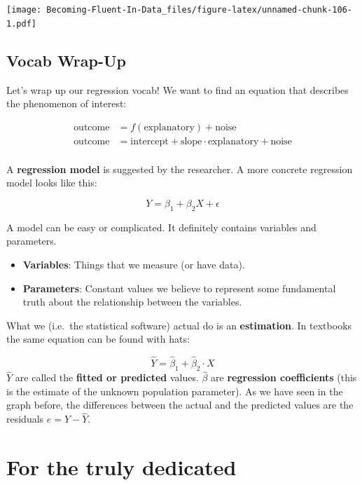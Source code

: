 \documentclass[
]{book}
\providecommand{\tightlist}{%
  \setlength{\itemsep}{0pt}\setlength{\parskip}{0pt}}
\begin{document}
\texttt{[image: Becoming-Fluent-In-Data\_files/figure-latex/unnamed-chunk-106-1.pdf]}

\hypertarget{vocab-wrap-up}{%
\subsection{Vocab Wrap-Up}\label{vocab-wrap-up}}

Let's wrap up our regression vocab! We want to find an equation that describes the phenomenon of interest:

\[ \begin{align}
\text{outcome} &= f(\text{explanatory}) + \text{noise} \tag{Generic statistical model} \\
\text{outcome} &= \text{intercept} + \text{slope} \cdot \text{explanatory} + \text{noise} \tag{Generic linear model} \\
\end{align}\]

A \textbf{regression model} is suggested by the researcher. A more concrete regression model looks like this:

\[Y = \beta_1 + \beta_2 X + \epsilon\]

A model can be easy or complicated. It definitely contains variables and parameters.

\begin{itemize}
\tightlist
\item
  \textbf{Variables}: Things that we measure (or have data).
\item
  \textbf{Parameters}: Constant values we believe to represent some fundamental truth about the relationship between the variables.
\end{itemize}

What we (i.e.~the statistical software) actual do is an \textbf{estimation}. In textbooks the same equation can be found with hats:

\[   \widehat{Y}  = \widehat{\beta}_1 + \widehat{\beta}_2 \cdot X \]
\(\widehat{Y}\) are called the \textbf{fitted or predicted} values. \(\widehat{\beta}\) are \textbf{regression coefficients} (this is the estimate of the unknown population parameter). As we have seen in the graph before, the differences between the actual and the predicted values are the residuals \(e = Y - \widehat{Y}\).

\hypertarget{for-the-truly-dedicated}{%
\section{For the truly dedicated}\label{for-the-truly-dedicated}}
\end{document}
